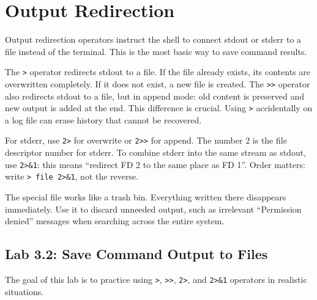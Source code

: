 \section{Output Redirection}
\label{sec:io-redirection}

Output redirection operators instruct the shell to connect stdout or stderr to a file instead of the terminal. This is the most basic way to save command results.

The \texttt{>} operator redirects stdout to a file. If the file already exists, its contents are overwritten completely. If it does not exist, a new file is created. The \texttt{>>} operator also redirects stdout to a file, but in append mode: old content is preserved and new output is added at the end. This difference is crucial. Using \texttt{>} accidentally on a log file can erase history that cannot be recovered.

For stderr, use \texttt{2>} for overwrite or \texttt{2>>} for append. The number 2 is the file descriptor number for stderr. To combine stderr into the same stream as stdout, use \texttt{2>\&1}: this means ``redirect FD 2 to the same place as FD 1''. Order matters: write \texttt{> file 2>\&1}, not the reverse.

The special file  works like a trash bin. Everything written there disappears immediately. Use it to discard unneeded output, such as irrelevant ``Permission denied'' messages when searching across the entire system.

\subsection*{Lab 3.2: Save Command Output to Files}

The goal of this lab is to practice using \texttt{>}, \texttt{>>}, \texttt{2>}, and \texttt{2>\&1} operators in realistic situations.

